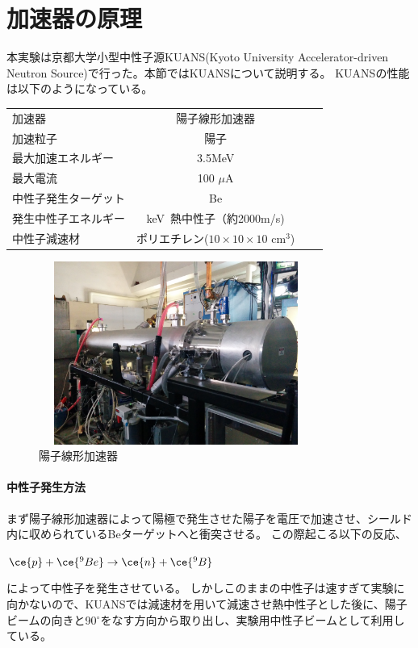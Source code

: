 
\begingroup
\section{加速器の原理}
本実験は京都大学小型中性子源KUANS(Kyoto University Accelerator-driven Neutron Source)で行った。本節ではKUANSについて説明する。
KUANSの性能は以下のようになっている。


\begin{table}[htb]\centering
\begin{tabular}{lcrr}
加速器&陽子線形加速器\\
加速粒子&陽子\\
最大加速エネルギー&3.5MeV\\
最大電流&100 $\mu$A \\
中性子発生ターゲット&Be\\
発生中性子エネルギー&keV~熱中性子（約2000m/s)\\
中性子減速材&ポリエチレン($10\times10\times10$ cm$^3$)\\
\end{tabular}
\end{table}
\begin{figure}[H]
\centering
\includegraphics[width=9cm,height=6cm]{accelerator/accphoto.jpg}
\caption{陽子線形加速器}
\end{figure}

\paragraph{中性子発生方法}
まず陽子線形加速器によって陽極で発生させた陽子を電圧で加速させ、シールド内に収められているBeターゲットへと衝突させる。
この際起こる以下の反応、
\begin{center}
$\ce{p} + \ce{^9Be} \to \ce{n} + \ce{^9B}$
\end{center}
によって中性子を発生させている。
しかしこのままの中性子は速すぎて実験に向かないので、KUANSでは減速材を用いて減速させ熱中性子とした後に、陽子ビームの向きと90$^{\circ}$をなす方向から取り出し、実験用中性子ビームとして利用している。
\newpage
